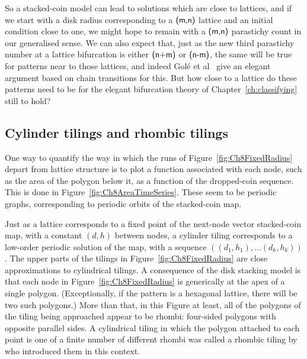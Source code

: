 So a stacked-coin model can lead to solutions which are close to lattices, and if we start with a disk radius corresponding to a $\textsf{(m,n)}$ lattice and an initial condition close to one, we might  hope to remain with a $\textsf{(m,n)}$ parastichy count in our generalised sense. We can also expect that, just as the new third parastichy number at a lattice bifurcation is either $\textsf{(n+m)}$ or $\textsf{(n-m)}$, the same will be true for patterns near to those lattices, and indeed Golé et al~\cite{goleFibonacciQuasisymmetricPhyllotaxis2016} give an elegant argument based on chain transitions for this. But how close to a lattice do these patterns need to be for  the  elegant bifurcation theory of Chapter~\ref{ch:classifying} still to hold? 


\clearpage
\subsection{Cylinder tilings and rhombic tilings}
\label{sec:tilings}

One way to quantify the way in which the runs of Figure~\ref{fig:Ch8FixedRadius} depart from lattice structure is to plot a function associated with each node, such as the area of the polygon below it,  as a function of the dropped-coin sequence. This is done in Figure~\ref{fig:Ch8AreaTimeSeries}. These seem to be periodic graphs, corresponding to periodic orbits of the stacked-coin map. 


Just as a lattice corresponds to a fixed point of the next-node vector stacked-coin map, with a constant $(d,h)$ between nodes, a cylinder tiling corresponds to a low-order periodic solution of the map, with a sequence $((d_1,h_1),\ldots (d_k,h_k) )$. The upper parts of the tilings in Figure~\ref{fig:Ch8FixedRadius} are close approximations to cylindrical tilings.
A consequence of the disk stacking model is that each node in Figure~\ref{fig:Ch8FixedRadius} is generically at the apex of a single polygon. (Exceptionally, if the pattern is a hexagonal lattice, there will be two such polygons.)
More than that, in this Figure at least, all of the polygons of the tiling being approached appear to be rhombi: four-sided polygons with opposite parallel sides.%
A cylindrical tiling in which the polygon attached to each point is one of a finite number of different rhombi was called a rhombic tiling by~\cite{atelaRhombicTilingsPrimordia2017} who introduced them in this context.

